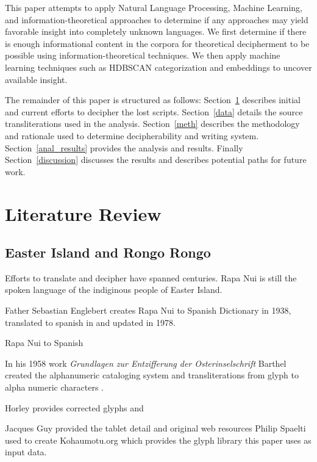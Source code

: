 \documentclass[preprint,12pt]{elsarticle}
\begin{document}
This paper attempts to apply Natural Language Processing, Machine Learning, and information-theoretical approaches to determine if any approaches may yield favorable insight into completely unknown languages. We first determine if there is enough informational content in the corpora for theoretical decipherment to be possible using information-theoretical techniques. We then apply machine learning techniques such as HDBSCAN categorization and embeddings to uncover available insight. 


The remainder of this paper is structured as follows: Section~\ref{lit} describes initial and current efforts to decipher the lost scripts. Section~\ref{data} details the source transliterations used in the analysis. Section~\ref{meth} describes the methodology and rationale used to determine decipherability and writing system.  Section~\ref{anal_results} provides the analysis and results. Finally Section~\ref{discussion} discusses the results and describes potential paths for future work. 

\section{Literature Review}
\label{lit}
\subsection{Easter Island and Rongo Rongo}
Efforts to translate and decipher have spanned centuries. Rapa Nui is still the spoken language of the indiginous people of Easter Island. \cite{}

Father Sebastian Englebert creates Rapa Nui to Spanish Dictionary in 1938, translated to spanish in and updated in 1978.\cite{englert1948diccionario}

Rapa Nui to Spanish \cite{englert1948diccionario}

In his 1958 work \emph{Grundlagen zur Entzifferung der Osterinselschrift} Barthel created the alphanumeric cataloging system and transliterations from glyph to alpha numeric characters \cite{barthel1958grundlagen}. 

Horley provides corrected glyphs and 

Jacques Guy provided the tablet detail \cite{guy_rongorongo_org} and original web resources Philip Spaelti used to create Kohaumotu.org which provides the glyph library this paper uses as input data. \cite{spaelti_2012_glyph}
\end{document}
